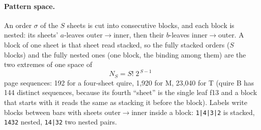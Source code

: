 \documentclass[11pt,a4paper]{article}
\newcommand{\order}[1]{\texttt{#1}}
\begin{document}
\paragraph{Pattern space.} An order $\sigma$ of the $S$ sheets is cut into consecutive blocks, and each block is nested: its sheets' $a$-leaves outer$\to$inner, then their $b$-leaves inner$\to$outer. A block of one sheet is that sheet read stacked, so the fully stacked orders ($S$ blocks) and the fully nested ones (one block, the binding among them) are the two extremes of one space of
\begin{equation}
N_S = S!\;2^{\,S-1}
\label{eq:patterns}
\end{equation}
page sequences: 192 for a four-sheet quire, 1,920 for M, 23,040 for T (quire B has 144 distinct sequences, because its fourth ``sheet'' is the single leaf f13 and a block that starts with it reads the same as stacking it before the block). Labels write blocks between bars with sheets outer$\to$inner inside a block: \order{1|4|3|2} is stacked, \order{1432} nested, \order{14|32} two nested pairs.
\end{document}
